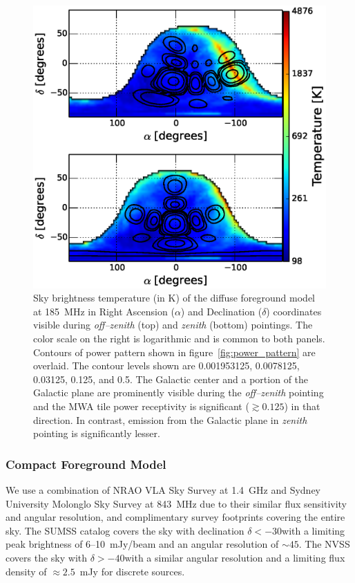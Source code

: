 \documentclass[preprint2,iop,numberedappendix]{emulateapj}
\begin{document}
\begin{figure}[htb]
\centering
\includegraphics[width=\linewidth]{figures/v1_0/dsm.eps}
\caption{Sky brightness temperature (in K) of the diffuse foreground model at 185~MHz in Right Ascension ($\alpha$) and Declination ($\delta$) coordinates visible during {\it off--zenith} (top) and {\it zenith} (bottom) pointings. The color scale on the right is logarithmic and is common to both panels. Contours of power pattern shown in figure~\ref{fig:power_pattern} are overlaid. The contour levels shown are 0.001953125, 0.0078125, 0.03125, 0.125, and 0.5. The Galactic center and a portion of the Galactic plane are prominently visible during the {\it off--zenith} pointing and the MWA tile power receptivity is significant ($\gtrsim 0.125$) in that direction. In contrast, emission from the Galactic plane in {\it zenith} pointing is significantly lesser. \label{fig:DSM}}
\end{figure}

\subsubsection{Compact Foreground Model}\label{sec:CSM}

We use a combination of NRAO VLA Sky Survey \citep[NVSS;][]{con98} at 1.4~GHz and Sydney University Molonglo Sky Survey \citep[SUMSS;][]{boc99,mau03} at 843~MHz due to their similar flux sensitivity and angular resolution, and complimentary survey footprints covering the entire sky. The SUMSS catalog covers the sky with declination $\delta < -30$\arcdeg with a limiting peak brightness of 6--10~mJy/beam and an angular resolution of $\sim 45$\arcsec. The NVSS covers the sky with $\delta > -40$\arcdeg with a similar angular resolution and a limiting flux density of $\approx 2.5$~mJy for discrete sources. 
\end{document}
